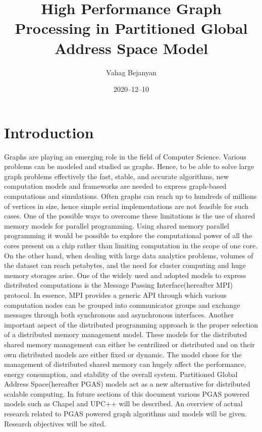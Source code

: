 \documentclass[14pt]{extreport}
\title{High Performance Graph Processing in Partitioned Global Address Space Model}
\date{2020--12--10}
\author{Vahag Bejanyan}
\newcommand\blankpage{
    \null
    \thispagestyle{empty}
    \newpage
    }
\begin{document}
\maketitle
{}
\newpage
{}

\tableofcontents
\blankpage

\chapter{Introduction}
Graphs are playing an emerging role in the field of Computer Science. Various problems can be modeled and studied as graphs\cite{fouss_saerens_shimbo_2016}. Hence, to be able to solve large graph problems effectively the fast, stable, and accurate algorithms, new computation models and frameworks are needed to express graph-based computations and simulations. Often graphs can reach up to hundreds of millions of vertices in size, hence simple serial implementations are not feasible for such cases. One of the possible ways to overcome these limitations is the use of shared memory models for parallel programming\cite{patterson_hennessy}. Using shared memory parallel programming it would be possible to explore the computational power of all the cores present on a chip rather than limiting computation in the scope of one core. On the other hand, when dealing with large data analytics problems\cite{hadoop}\cite{mapreduce}, volumes of the dataset can reach petabytes, and the need for cluster computing and huge memory storages arise.  One of the widely used and adopted models to express distributed computations is the Message Passing Interface(hereafter MPI) protocol. In essence, MPI provides a generic API through which various computation nodes can be grouped into communicator groups and exchange messages through both synchronous and asynchronous interfaces. Another important aspect of the distributed programming approach is the proper selection of a distributed memory management model\cite{dsmmng}. These models for the distributed shared memory management can either be centrilized or distributed and on their own distributed models are either fixed or dynamic. The model chose for the management of distributed shared memory can hugely affect the performance, energy consumption, and stability of the overall system. Partitioned Global Address Space(hereafter PGAS) models act as a new alternative for distributed scalable computing. In future sections of this document various PGAS powered models such as Chapel and UPC++ will be described. An overview of actual research related to PGAS powered graph algorithms and models will be given. Research objectives will be sited.
\end{document}
